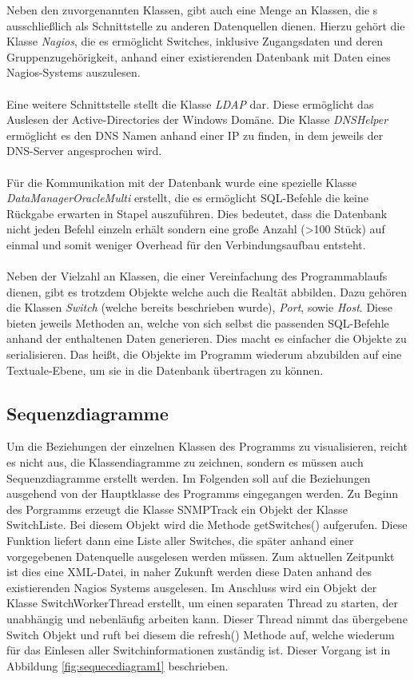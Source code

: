 Neben den zuvorgenannten Klassen, gibt auch eine Menge an Klassen, die s ausschließlich als Schnittstelle zu anderen Datenquellen dienen.
Hierzu gehört die Klasse \textit{Nagios}, die es ermöglicht Switches, inklusive Zugangsdaten und deren Gruppenzugehörigkeit, anhand einer existierenden Datenbank mit Daten eines Nagios-Systems auszulesen.\\\\
Eine weitere Schnittstelle stellt die Klasse \textit{LDAP} dar. Diese ermöglicht das Auslesen der Active-Directories der Windows Domäne.
Die Klasse \textit{DNSHelper} ermöglicht es den DNS Namen anhand einer IP zu finden, in dem jeweils der DNS-Server angesprochen wird.\\\\
Für die Kommunikation mit der Datenbank wurde eine spezielle Klasse \textit{DataManagerOracleMulti} erstellt, die es ermöglicht SQL-Befehle die keine Rückgabe erwarten in Stapel auszuführen.
Dies bedeutet, dass die Datenbank nicht jeden Befehl einzeln erhält sondern eine große Anzahl (>100 Stück) auf einmal und somit weniger Overhead für den Verbindungsaufbau entsteht.\\\\
Neben der Vielzahl an Klassen, die einer Vereinfachung des Programmablaufs dienen, gibt es trotzdem Objekte welche auch die Realtät abbilden.
Dazu gehören die Klassen \textit{Switch} (welche bereits beschrieben wurde), \textit{Port}, sowie \textit{Host}.
Diese bieten jeweils Methoden an, welche von sich selbst die passenden SQL-Befehle anhand der enthaltenen Daten generieren. Dies macht es einfacher die Objekte zu serialisieren.
Das heißt, die Objekte im Programm wiederum abzubilden auf eine Textuale-Ebene, um sie in die Datenbank übertragen zu können.\\


\subsection{Sequenzdiagramme}
\label{subsec:seqdiagrams}

Um die Beziehungen der einzelnen Klassen des Programms zu visualisieren, reicht es nicht aus, die Klassendiagramme zu zeichnen, sondern es müssen auch Sequenzdiagramme erstellt werden.
Im Folgenden soll auf die Beziehungen ausgehend von der Hauptklasse des Programms eingegangen werden.
Zu Beginn des Porgramms erzeugt die Klasse SNMPTrack ein Objekt der Klasse SwitchListe.
Bei diesem Objekt wird die Methode getSwitches() aufgerufen.
Diese Funktion liefert dann eine Liste aller Switches, die später anhand einer vorgegebenen Datenquelle ausgelesen werden müssen.
Zum aktuellen Zeitpunkt ist dies eine XML-Datei, in naher Zukunft werden diese Daten anhand des existierenden Nagios Systems ausgelesen. Im Anschluss wird ein Objekt der Klasse SwitchWorkerThread erstellt, um einen separaten Thread zu starten, der unabhängig und nebenläufig arbeiten kann. Dieser Thread nimmt das übergebene Switch Objekt und ruft bei diesem die refresh() Methode auf, welche wiederum für das Einlesen aller Switchinformationen zuständig ist.
Dieser Vorgang ist in Abbildung \ref{fig:sequecediagram1} beschrieben.


